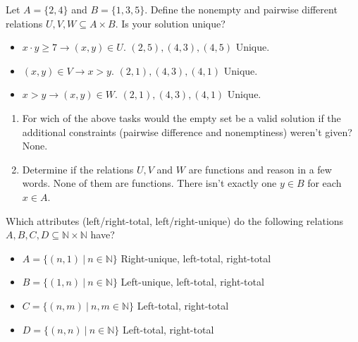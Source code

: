 \documentclass{exercise}
\begin{document}
   Let $A = \{ 2, 4 \} $ and $B = \{ 1, 3, 5 \} $. Define the nonempty and pairwise different relations $U, V, W \subseteq A \times B$. Is your solution unique?
    \begin{itemize}
      \item $x \cdot y \geq 7 \rightarrow (x, y) \in U$.
        \newline
        $(2,5),(4,3),(4,5)$ Unique.
      \item $(x, y) \in V \rightarrow x > y$.
        \newline
        $(2,1),(4,3),(4,1)$ Unique.
      \item $x > y \rightarrow (x, y) \in W$.
        \newline
        $(2,1),(4,3),(4,1)$ Unique.
    \end{itemize}

    \begin{enumerate}
      \item For wich of the above tasks would the empty set be a valid solution if the additional constraints (pairwise difference and nonemptiness) weren't given?
      \newline
      None.

      \item Determine if the relations $U, V$ and $W$ are functions and reason in a few words.
      \newline
      None of them are functions. There isn't exactly one $y \in B$ for each $x \in A$.

    \end{enumerate}

   Which attributes (left/right-total, left/right-unique) do the following relations $A, B, C, D \subseteq \mathbb{N} \times \mathbb{N}$ have?
    \begin{itemize}
      \item $A = \{(n, 1) \: | \: n \in \mathbb{N}\}$
      \newline
      Right-unique, left-total, right-total
      \item $B = \{(1, n) \: | \: n \in \mathbb{N}\}$
      \newline
      Left-unique, left-total, right-total
      \item $C = \{(n, m) \: | \: n,m \in \mathbb{N}\}$
      \newline
      Left-total, right-total
      \item $D = \{(n, n) \: | \: n \in \mathbb{N}\}$
      \newline
      Left-total, right-total
    \end{itemize}
\end{document}

